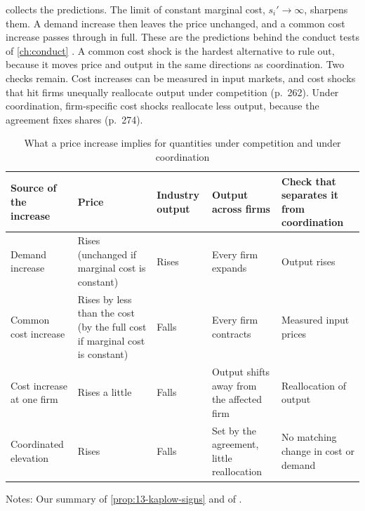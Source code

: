  collects the predictions. The limit of constant marginal cost, $s_i' \to \infty$,
sharpens them. A demand increase then leaves the price unchanged, and a common cost increase passes through in
full. These are the predictions behind the conduct tests of \cref{ch:conduct} \citep[pp.~273--274]{Kaplow2013}. A
common cost shock is the hardest alternative to rule out, because it moves price and output in the same directions
as coordination. Two checks remain. Cost increases can be measured in input markets, and cost shocks that hit firms
unequally reallocate output under competition (p.~262). Under coordination, firm-specific cost shocks reallocate
less output, because the agreement fixes shares (p.~274).

\begin{table}[htbp]
\centering
\caption{What a price increase implies for quantities under competition and under coordination}
\label{tab:13-kaplow-signs}
\footnotesize
\begin{tabularx}{\textwidth}{@{}>{\raggedright\arraybackslash}p{2.6cm}>{\raggedright\arraybackslash}X>{\raggedright\arraybackslash}p{1.8cm}>{\raggedright\arraybackslash}X>{\raggedright\arraybackslash}X@{}}
\toprule
Source of the increase & Price & Industry output & Output across firms & Check that separates it from coordination\\
\midrule
Demand increase & Rises (unchanged if marginal cost is constant) & Rises & Every firm expands & Output
rises\\
\addlinespace
Common cost increase & Rises by less than the cost (by the full cost if marginal cost is constant) & Falls &
Every firm contracts & Measured input prices\\
\addlinespace
Cost increase at one firm & Rises a little & Falls & Output shifts away from the affected firm & Reallocation of
output\\
\addlinespace
Coordinated elevation & Rises & Falls & Set by the agreement, little reallocation & No matching change in cost or
demand\\
\bottomrule
\end{tabularx}

\smallskip
\begin{minipage}{0.95\textwidth}\footnotesize
Notes: Our summary of \cref{prop:13-kaplow-signs} and of \citet[pp.~260--262 and 273--274]{Kaplow2013}.
\end{minipage}
\end{table}

